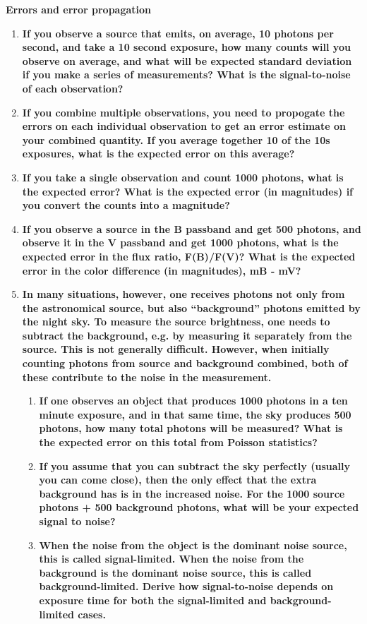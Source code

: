 \documentclass[12pt]{article}
\begin{document}


\textbf{Errors and error propagation}\small
\begin{enumerate}
    \item\textbf{If you observe a source that emits, on average, 10
    photons per second, and take a 10 second exposure, how many counts
    will you observe on average, and what will be expected standard
    deviation if you make a series of measurements? What is the
    signal-to-noise of each observation?}
    \item\textbf{If you combine multiple observations, you need to
    propogate the errors on each individual observation to get an
    error estimate on your combined quantity. If you average together
    10 of the 10s exposures, what is the expected error on this
    average?}
    \item\textbf{If you take a single observation and count 1000
    photons, what is the expected error? What is the expected error
    (in magnitudes) if you convert the counts into a magnitude?}
    \item\textbf{If you observe a source in the B passband and get 500
    photons, and observe it in the V passband and get 1000 photons,
    what is the expected error in the flux ratio, F(B)/F(V)? What is
    the expected error in the color difference (in magnitudes), mB -
    mV?}
    \item\textbf{In many situations, however, one receives photons not
    only from the astronomical source, but also ``background'' photons
    emitted by the night sky. To measure the source brightness, one
    needs to subtract the background, e.g. by measuring it separately
    from the source. This is not generally difficult. However, when
    initially counting photons from source and background combined,
    both of these contribute to the noise in the measurement.}
    \begin{enumerate}
        \item\textbf{If one observes an object that produces 1000
        photons in a ten minute exposure, and in that same time, the
        sky produces 500 photons, how many total photons will be
        measured? What is the expected error on this total from
        Poisson statistics?}
        \item\textbf{If you assume that you can subtract the sky
        perfectly (usually you can come close), then the only effect
        that the extra background has is in the increased noise. For
        the 1000 source photons + 500 background photons, what will be
        your expected signal to noise?}
        \item\textbf{When the noise from the object is the dominant
        noise source, this is called signal-limited. When the noise
        from the background is the dominant noise source, this is
        called background-limited. Derive how signal-to-noise depends
        on exposure time for both the signal-limited and
        background-limited cases.}
    \end{enumerate}

\end{enumerate}


\end{document}
